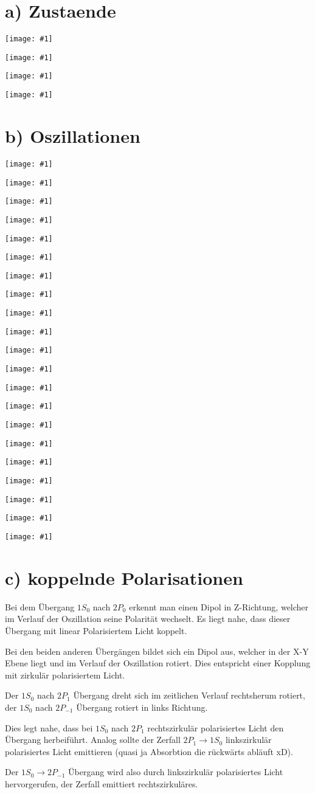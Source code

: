 \documentclass[a4paper, landscape]{scrreprt}
\def\jafp#1{
    \begin{center}
    \texttt{[image: \#1]}
    \end{center}
}
\begin{document}
\section*{a) Zustaende}
\jafp{1s0}
\jafp{2p-1}
\jafp{2p0}
\jafp{2p1}

\section*{b) Oszillationen}
\jafp{osc_-1_0}
\jafp{osc_-1_1}
\jafp{osc_-1_2}
\jafp{osc_-1_3}
\jafp{osc_-1_4}
\jafp{osc_-1_5}
\jafp{osc_-1_6}

\jafp{osc_0_0}
\jafp{osc_0_1}
\jafp{osc_0_2}
\jafp{osc_0_3}
\jafp{osc_0_4}
\jafp{osc_0_5}
\jafp{osc_0_6}

\jafp{osc_1_0}
\jafp{osc_1_1}
\jafp{osc_1_2}
\jafp{osc_1_3}
\jafp{osc_1_4}
\jafp{osc_1_5}
\jafp{osc_1_6}

\section*{c) koppelnde Polarisationen}

Bei dem \"Ubergang $1S_0$ nach $2P_0$ erkennt man einen Dipol in Z-Richtung, welcher im Verlauf der Oszillation seine Polarit\"at wechselt. Es liegt nahe, dass dieser \"Ubergang mit linear Polarisiertem Licht koppelt.

Bei den beiden anderen \"Uberg\"angen bildet sich ein Dipol aus, welcher in der X-Y Ebene liegt und im Verlauf der Oszillation rotiert. Dies entspricht einer Kopplung mit zirkul\"ar polarisiertem Licht.

Der $1S_0$ nach $2P_1$ \"Ubergang dreht sich im zeitlichen Verlauf rechtsherum rotiert, der $1S_0$ nach $2P_{-1}$ \"Ubergang rotiert in links Richtung.

Dies legt nahe, dass bei $1S_0$ nach $2P_1$ rechtszirkul\"ar polarisiertes Licht den \"Ubergang herbeif\"uhrt. Analog sollte der Zerfall $2P_1 \rightarrow 1S_0$ linkszirkul\"ar polarisiertes Licht emittieren (quasi ja Absorbtion die r\"uckw\"arts abl\"auft xD).

Der $1S_0 \rightarrow 2P_{-1}$ \"Ubergang wird also durch linkszirkul\"ar polarisiertes Licht hervorgerufen, der Zerfall emittiert rechtszirkul\"ares.
\end{document}

